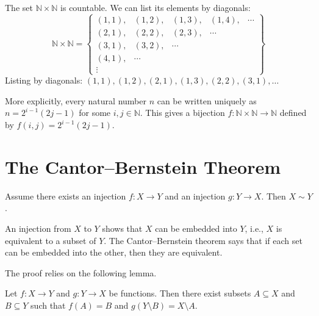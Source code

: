\documentclass[11pt]{report}
\begin{document}
\begin{exbox}
The set $\mathbb{N} \times \mathbb{N}$ is countable. We can list its elements by diagonals:
\[
\mathbb{N} \times \mathbb{N} = \left\{
\begin{array}{ccccc}
(1,1), & (1,2), & (1,3), & (1,4), & \cdots \\
(2,1), & (2,2), & (2,3), & \cdots & \\
(3,1), & (3,2), & \cdots & & \\
(4,1), & \cdots & & & \\
\vdots & & & &
\end{array}
\right\}
\]
Listing by diagonals: $(1,1), (1,2), (2,1), (1,3), (2,2), (3,1), \ldots$

More explicitly, every natural number $n$ can be written uniquely as $n = 2^{i-1}(2j-1)$ for some $i, j \in \mathbb{N}$. This gives a bijection $f: \mathbb{N} \times \mathbb{N} \to \mathbb{N}$ defined by $f(i,j) = 2^{i-1}(2j-1)$.
\end{exbox}

\section{The Cantor--Bernstein Theorem}

\begin{thmbox}
Assume there exists an injection $f: X \to Y$ and an injection $g: Y \to X$. Then $X \sim Y$.
\end{thmbox}

\begin{rembox}
An injection from $X$ to $Y$ shows that $X$ can be embedded into $Y$, i.e., $X$ is equivalent to a subset of $Y$. The Cantor--Bernstein theorem says that if each set can be embedded into the other, then they are equivalent.
\end{rembox}

The proof relies on the following lemma.

\begin{lembox}
Let $f: X \to Y$ and $g: Y \to X$ be functions. Then there exist subsets $A \subseteq X$ and $B \subseteq Y$ such that $f(A) = B$ and $g(Y \setminus B) = X \setminus A$.
\end{lembox}
\end{document}
